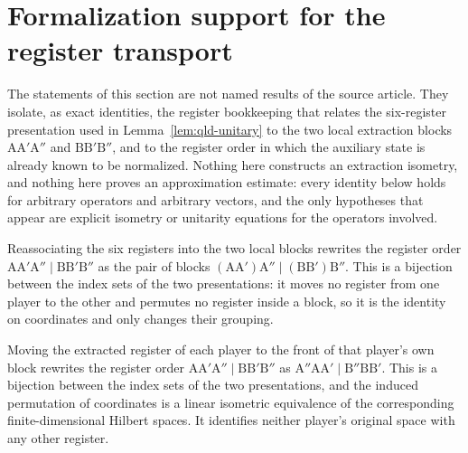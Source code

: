 \section{Formalization support for the register transport}

The statements of this section are not named results of the source article.  They isolate, as exact identities, the register bookkeeping that relates the six-register presentation used in Lemma~\ref{lem:qld-unitary} to the two local extraction blocks $\mathrm{A}\mathrm{A}'\mathrm{A}''$ and $\mathrm{B}\mathrm{B}'\mathrm{B}''$, and to the register order in which the auxiliary state is already known to be normalized.  Nothing here constructs an extraction isometry, and nothing here proves an approximation estimate: every identity below holds for arbitrary operators and arbitrary vectors, and the only hypotheses that appear are explicit isometry or unitarity equations for the operators involved.

\begin{definition}\label{def:extraction-block-order}
	\leanok
	Reassociating the six registers into the two local blocks rewrites the register order $\mathrm{A}\mathrm{A}'\mathrm{A}'' \mid \mathrm{B}\mathrm{B}'\mathrm{B}''$ as the pair of blocks $(\mathrm{A}\mathrm{A}')\mathrm{A}'' \mid (\mathrm{B}\mathrm{B}')\mathrm{B}''$.  This is a bijection between the index sets of the two presentations: it moves no register from one player to the other and permutes no register inside a block, so it is the identity on coordinates and only changes their grouping.
\end{definition}

\begin{definition}\label{def:extraction-epr-first-order}
	\leanok
	Moving the extracted register of each player to the front of that player's own block rewrites the register order $\mathrm{A}\mathrm{A}'\mathrm{A}'' \mid \mathrm{B}\mathrm{B}'\mathrm{B}''$ as $\mathrm{A}''\mathrm{A}\mathrm{A}' \mid \mathrm{B}''\mathrm{B}\mathrm{B}'$.  This is a bijection between the index sets of the two presentations, and the induced permutation of coordinates is a linear isometric equivalence of the corresponding finite-dimensional Hilbert spaces.  It identifies neither player's original space with any other register.
\end{definition}

